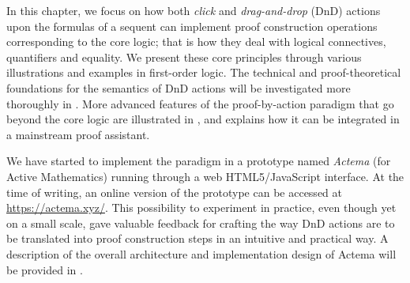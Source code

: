 


In this chapter, we focus on how both \emph{click} and \emph{drag-and-drop}
(DnD) actions upon the formulas of a sequent can implement proof construction
operations corresponding to the core logic; that is how they deal with logical
connectives, quantifiers and equality. We present these core principles through
various illustrations and examples in first-order logic. The technical and
proof-theoretical foundations for the semantics of DnD actions
will be investigated more thoroughly in .
More advanced features of the proof-by-action paradigm that go beyond the core
logic are illustrated in , and  explains how it
can be integrated in a mainstream proof assistant.

We have started to implement the paradigm in a prototype named {\em Actema} (for
Active Mathematics) running through a web HTML5/JavaScript interface. At the
time of writing, an online version of the prototype can be accessed at
\url{https://actema.xyz/}. This possibility to experiment in
practice, even though yet on a small scale, gave valuable feedback for crafting
the way DnD actions are to be translated into proof construction steps in an
intuitive and practical way. A description of the overall architecture and
implementation design of Actema will be provided in .

